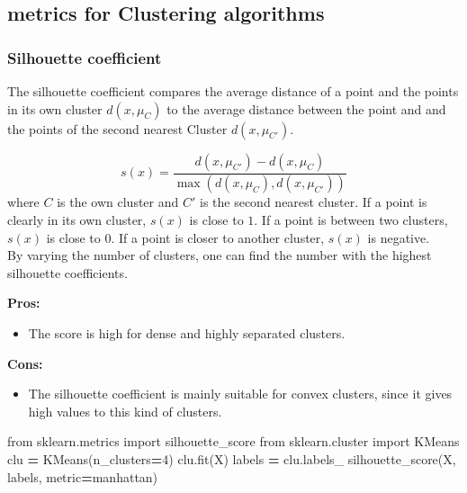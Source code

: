 \documentclass[
]{book}
\newenvironment{Shaded}{\begin{snugshade}}{\end{snugshade}}
\newcommand{\DecValTok}[1]{\textcolor[rgb]{0.00,0.00,0.81}{#1}}
\newcommand{\ImportTok}[1]{#1}
\newcommand{\NormalTok}[1]{#1}
\newcommand{\OperatorTok}[1]{\textcolor[rgb]{0.81,0.36,0.00}{\textbf{#1}}}
\newcommand{\StringTok}[1]{\textcolor[rgb]{0.31,0.60,0.02}{#1}}
\providecommand{\tightlist}{%
  \setlength{\itemsep}{0pt}\setlength{\parskip}{0pt}}
\begin{document}
\hypertarget{metrics-for-clustering-algorithms}{%
\subsection{metrics for Clustering algorithms}\label{metrics-for-clustering-algorithms}}

\hypertarget{silhouette-coefficient}{%
\subsubsection{Silhouette coefficient}\label{silhouette-coefficient}}

The silhouette coefficient compares the average distance of a point and
the points in its own cluster \(d(x,\mu_{C})\) to the average distance
between the point and and the points of the second nearest Cluster
\(d(x,\mu_{C'})\).

\[s(x) = \frac{d(x,\mu_{C'})-d(x,\mu_{C})}{\max(d(x,\mu_{C}), d(x,\mu_{C'}))}\]
where \(C\) is the own cluster and \(C'\) is the second nearest cluster. If
a point is clearly in its own cluster, \(s(x)\) is close to \(1\). If a
point is between two clusters, \(s(x)\) is close to 0. If a point is
closer to another cluster, \(s(x)\) is negative.\\
By varying the number of clusters, one can find the number with the
highest silhouette coefficients.

\textbf{Pros:}

\begin{itemize}
\tightlist
\item
  The score is high for dense and highly separated clusters.
\end{itemize}

\textbf{Cons:}

\begin{itemize}
\tightlist
\item
  The silhouette coefficient is mainly suitable for convex clusters,
  since it gives high values to this kind of clusters.
\end{itemize}

\begin{Shaded}
\begin{Highlighting}[]
\ImportTok{from}\NormalTok{ sklearn.metrics }\ImportTok{import}\NormalTok{ silhouette\_score}
\ImportTok{from}\NormalTok{ sklearn.cluster }\ImportTok{import}\NormalTok{ KMeans}
\NormalTok{clu }\OperatorTok{=}\NormalTok{ KMeans(n\_clusters}\OperatorTok{=}\DecValTok{4}\NormalTok{)}
\NormalTok{clu.fit(X)}
\NormalTok{labels }\OperatorTok{=}\NormalTok{ clu.labels\_}
\NormalTok{silhouette\_score(X, labels, metric}\OperatorTok{=}\StringTok{\textquotesingle{}manhattan\textquotesingle{}}\NormalTok{)}
\end{Highlighting}
\end{Shaded}
\end{document}

